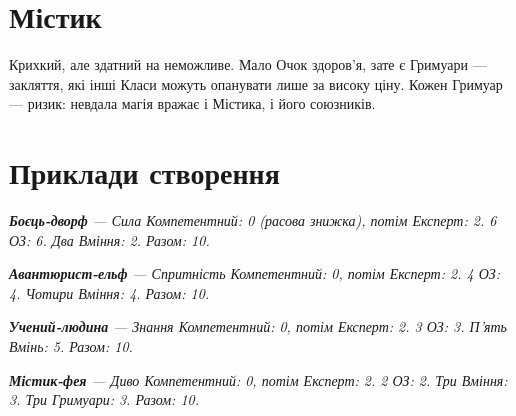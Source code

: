 \documentclass[10pt,a4paper]{article}
\begin{document}
\section*{Містик}
Крихкий, але здатний на неможливе. Мало Очок здоров'я, зате є Гримуари — закляття, які інші Класи можуть опанувати лише за високу ціну. Кожен Гримуар — ризик: невдала магія вражає і Містика, і його союзників.
\section*{Приклади створення}

\textbf{\textit{Боєць-дворф}}\textit{ — Сила Компетентний: 0 (расова знижка), потім Експерт: 2. 6 ОЗ: 6. Два Вміння: 2. Разом: 10.}

\textbf{\textit{Авантюрист-ельф}}\textit{ — Спритність Компетентний: 0, потім Експерт: 2. 4 ОЗ: 4. Чотири Вміння: 4. Разом: 10.}

\textbf{\textit{Учений-людина}}\textit{ — Знання Компетентний: 0, потім Експерт: 2. 3 ОЗ: 3. П'ять Вмінь: 5. Разом: 10.}

\textbf{\textit{Містик-фея}}\textit{ — Диво Компетентний: 0, потім Експерт: 2. 2 ОЗ: 2. Три Вміння: 3. Три Гримуари: 3. Разом: 10.}
\end{document}
